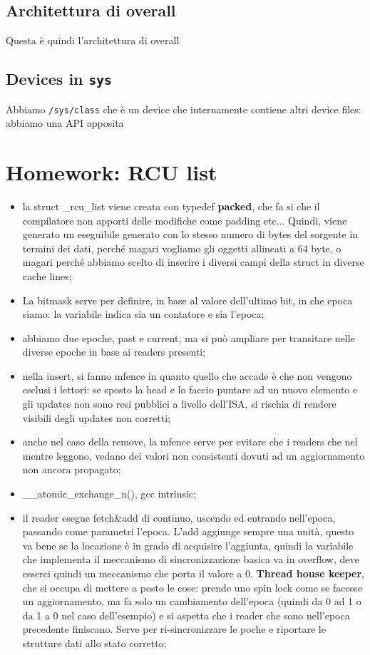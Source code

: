 \documentclass[12pt, oneside]{extbook}
\begin{document}
\subsection{Architettura di overall}
Questa è quindi l'architettura di overall
\subsection{Devices in \texttt{sys}}
Abbiamo \texttt{/sys/class} che è un device che internamente contiene altri device files: abbiamo una API apposita


\newpage
\section*{Homework: RCU list}
\begin{itemize}
\item la struct \_rcu\_list viene creata con typedef \textbf{packed}, che fa si che il compilatore non apporti delle modifiche come padding etc... Quindi, viene generato un eseguibile generato con lo stesso numero di bytes del sorgente in termini dei dati, perché magari vogliamo gli oggetti allineati a 64 byte, o magari perché abbiamo scelto di inserire i diversi campi della struct in diverse cache lines;
\item La bitmask serve per definire, in base al valore dell'ultimo bit, in che epoca siamo: la variabile indica sia un contatore e sia l'epoca;
\item abbiamo due epoche, past e current, ma si può ampliare per transitare nelle diverse epoche in base ai readers presenti;
\item nella insert, si fanno mfence in quanto quello che accade è che non vengono esclusi i lettori: se sposto la head e lo faccio puntare ad un nuovo elemento e gli updates non sono resi pubblici a livello dell'ISA, si rischia di rendere visibili degli updates non corretti;
\item anche nel caso della remove, la mfence serve per evitare che i readers che nel mentre leggono, vedano dei valori non consistenti dovuti ad un aggiornamento non ancora propagato;
\item \_\_atomic\_exchange\_n(), gcc intrinsic;
\item il reader esegue fetch\&add di continuo, uscendo ed entrando nell'epoca, passando come parametri l'epoca. L'add aggiunge sempre una unità, questo va bene se la locazione è in grado di acquisire l'aggiunta, quindi la variabile che implementa il meccanismo di sincronizzazione basica va in overflow, deve esserci quindi un meccanismo che porta il valore a 0. \textbf{Thread house keeper}, che si occupa di mettere a posto le cose: prende uno spin lock come se facesse un aggiornamento, ma fa solo un cambiamento dell'epoca (quindi da 0 ad 1 o da 1 a 0 nel caso dell'esempio) e si aspetta che i reader che sono nell'epoca precedente finiscano. Serve per ri-sincronizzare le poche e riportare le strutture dati allo stato corretto;
\end{itemize}
\end{document}
